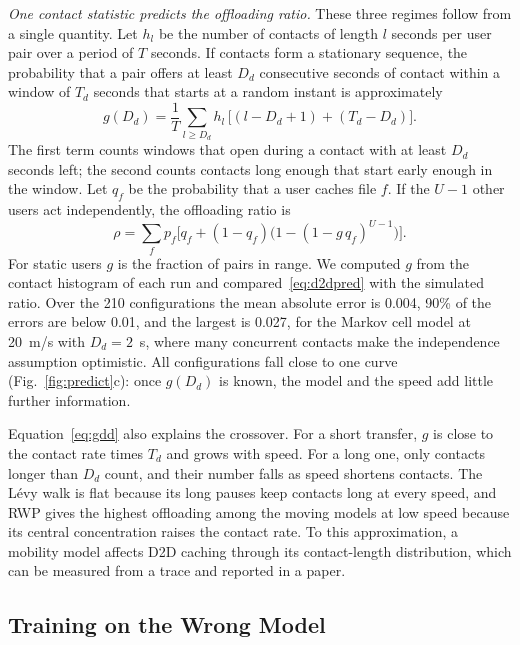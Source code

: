 \emph{One contact statistic predicts the offloading ratio.} These three regimes follow from a single quantity. Let $h_l$ be the number of contacts of length $l$ seconds per user pair over a period of $T$ seconds. If contacts form a stationary sequence, the probability that a pair offers at least $D_d$ consecutive seconds of contact within a window of $T_d$ seconds that starts at a random instant is approximately
\begin{equation}
g(D_d)=\frac{1}{T}\sum_{l\ge D_d} h_l\,\big[(l-D_d+1)+(T_d-D_d)\big].
\label{eq:gdd}
\end{equation}
The first term counts windows that open during a contact with at least $D_d$ seconds left; the second counts contacts long enough that start early enough in the window. Let $q_f$ be the probability that a user caches file $f$. If the $U-1$ other users act independently, the offloading ratio is
\begin{equation}
\rho=\sum_f p_f\Big[q_f+(1-q_f)\big(1-(1-g\,q_f)^{U-1}\big)\Big].
\label{eq:d2dpred}
\end{equation}
For static users $g$ is the fraction of pairs in range. We computed $g$ from the contact histogram of each run and compared~\eqref{eq:d2dpred} with the simulated ratio. Over the 210 configurations the mean absolute error is 0.004, 90\% of the errors are below 0.01, and the largest is 0.027, for the Markov cell model at 20~m/s with $D_d=2$~s, where many concurrent contacts make the independence assumption optimistic. All configurations fall close to one curve (Fig.~\ref{fig:predict}c): once $g(D_d)$ is known, the model and the speed add little further information.

Equation~\eqref{eq:gdd} also explains the crossover. For a short transfer, $g$ is close to the contact rate times $T_d$ and grows with speed. For a long one, only contacts longer than $D_d$ count, and their number falls as speed shortens contacts. The L\'evy walk is flat because its long pauses keep contacts long at every speed, and RWP gives the highest offloading among the moving models at low speed because its central concentration raises the contact rate. To this approximation, a mobility model affects D2D caching through its contact-length distribution, which can be measured from a trace and reported in a paper.

\subsection{Training on the Wrong Model}
\label{subsec:mismatch}

